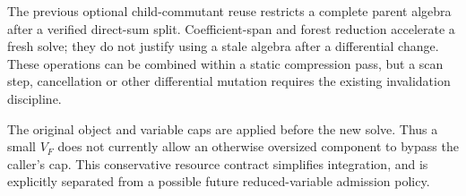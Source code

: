 \documentclass[11pt]{article}
\theoremstyle{definition}
\begin{document}
The previous optional child-commutant reuse restricts a complete
parent algebra after a verified direct-sum split. Coefficient-span
and forest reduction accelerate a fresh solve; they do not justify
using a stale algebra after a differential change. These operations
can be combined within a static compression pass, but a scan step,
cancellation or other differential mutation requires the existing
invalidation discipline.

The original object and variable caps are applied before the new
solve. Thus a small $V_F$ does not currently allow an otherwise
oversized component to bypass the caller's cap. This conservative
resource contract simplifies integration, and is explicitly
separated from a possible future reduced-variable admission policy.





\end{document}
